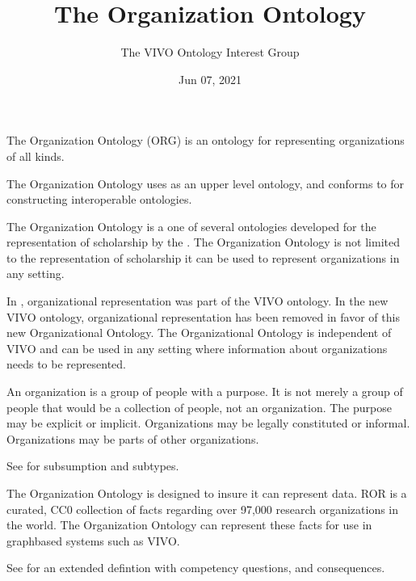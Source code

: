 \documentclass[letterpaper,10pt,english]{sphinxmanual}
\title{The Organization Ontology}
\date{Jun 07, 2021}
\author{The VIVO Ontology Interest Group}
\begin{document}
\pagestyle{empty}
\sphinxmaketitle
\pagestyle{plain}
\sphinxtableofcontents
\pagestyle{normal}
\label{\detokenize{index::doc}}


\sphinxAtStartPar
The Organization Ontology (ORG) is an ontology for
representing organizations of all kinds.

\sphinxAtStartPar
The Organization Ontology uses  as an upper level ontology, and conforms to
 for constructing interoperable ontologies.

\sphinxAtStartPar
The Organization
Ontology is a one of several ontologies developed for the representation of
scholarship by the . The Organization Ontology is
not limited to the representation of
scholarship \textendash{} it can be used to represent organizations in any setting.

\sphinxAtStartPar
In {\hyperref[\detokenize{glossary:glossary}]{}}, organizational representation was part of the VIVO
ontology.  In the new VIVO ontology, organizational
representation has been removed in favor of this new Organizational Ontology.  The
Organizational Ontology
is independent of VIVO and
can be used in any setting where information about organizations needs to be
represented.

\sphinxAtStartPar
An organization is a group of people with a purpose. It is not merely a group of
people \textendash{} that would be a collection of people, not an organization. The purpose
may be explicit or implicit. Organizations may be legally constituted or informal.
Organizations may be parts of other organizations.

\sphinxAtStartPar
See {\hyperref[\detokenize{organizations:organizations}]{}} for subsumption and subtypes.

\sphinxAtStartPar
The Organization Ontology is designed to insure it can represent
 data. ROR is a curated, CC0
collection of facts regarding over 97,000 research organizations in the world. The
Organization Ontology can represent these facts for use in graph\sphinxhyphen{}based systems such
as VIVO.

\sphinxAtStartPar
See {\hyperref[\detokenize{domain-definition:domain-definition}]{}} for an extended defintion with
competency questions,
and consequences.
\end{document}
